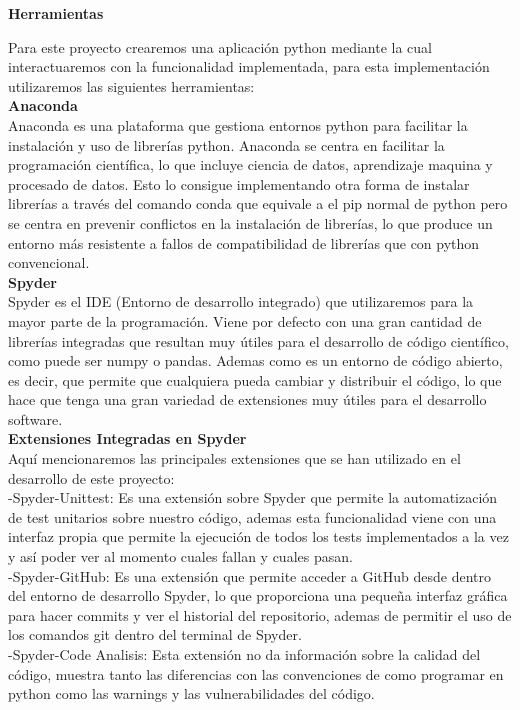 \documentclass[12pt, letterpaper, twoside]{article}
\begin{document}
		{\bfseries\normalsize Herramientas \par}
Para este proyecto crearemos una aplicación python mediante la cual interactuaremos con la funcionalidad implementada, para esta implementación utilizaremos las siguientes herramientas:\\
{\textbf{Anaconda}}\\
Anaconda es una plataforma que gestiona entornos python para facilitar la instalación y uso de librerías python. Anaconda se centra en facilitar la programación científica, lo que incluye ciencia de datos, aprendizaje maquina y procesado de datos. Esto lo consigue implementando otra forma de instalar librerías a través del comando conda que equivale a el pip normal de python pero se centra en prevenir conflictos en la instalación de librerías, lo que produce un entorno más resistente a fallos de compatibilidad de librerías que con python convencional.\\
{\textbf{Spyder}}\\
Spyder es el IDE (Entorno de desarrollo integrado) que utilizaremos para la mayor parte de la programación. Viene por defecto con una gran cantidad de librerías integradas que resultan muy útiles para el desarrollo de código científico, como puede ser numpy o pandas. Ademas como es un entorno de código abierto, es decir, que permite que cualquiera pueda cambiar y distribuir el código, lo que hace que tenga una gran variedad de extensiones muy útiles para el desarrollo software.\\
{\textbf{Extensiones Integradas en Spyder}}\\
Aquí mencionaremos las principales extensiones que se han utilizado en el desarrollo de este proyecto:\\
-Spyder-Unittest: Es una extensión sobre Spyder que permite la automatización de test unitarios sobre nuestro código, ademas esta funcionalidad viene con una interfaz propia que permite la ejecución de todos los tests implementados a la vez y así poder ver al momento cuales fallan y cuales pasan.\\
-Spyder-GitHub: Es una extensión que permite acceder a GitHub desde dentro del entorno de desarrollo Spyder, lo que proporciona una pequeña interfaz gráfica para hacer commits y ver el historial del repositorio, ademas de permitir el uso de los comandos git dentro del terminal de Spyder.\\
-Spyder-Code Analisis: Esta extensión no da información sobre la calidad del código, muestra tanto las diferencias con las convenciones de como programar en python como las warnings y las vulnerabilidades del código.\\
\end{document}
